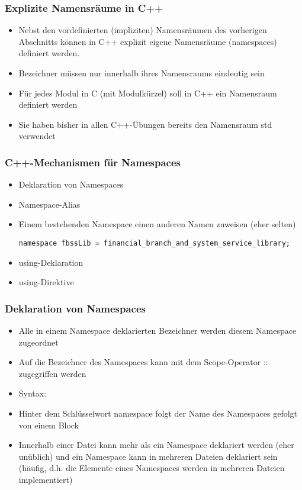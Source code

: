 \subsubsection{Explizite Namensräume in C++\hfill}
\label{sec:unterunterabschnitt}
\begin{itemize}
	\item Nebst den vordefinierten (impliziten) Namensräumen des vorherigen Abschnitts können in C++ explizit eigene Namensräume (namespaces) definiert werden.
	\item Bezeichner müssen nur innerhalb ihres Namensraums eindeutig sein
	\item Für jedes Modul in C (mit Modulkürzel) soll in C++ ein Namensraum definiert werden
	\item Sie haben bisher in allen C++-Übungen bereits den Namensraum std verwendet
\end{itemize}

\subsubsection{C++-Mechanismen für Namespaces\hfill}
\label{sec:unterunterabschnitt}
\begin{itemize}
	\item Deklaration von Namespaces
	\item Namespace-Alias
	\item[\-] Einem bestehenden Namespace einen anderen Namen zuweisen (eher selten)
\noindent
\begin{minipage}{\linewidth}
\begin{lstlisting}
namespace fbssLib = financial_branch_and_system_service_library;
\end{lstlisting}
\end{minipage}
	\item using-Deklaration
	\item using-Direktive
\end{itemize}

\subsubsection{Deklaration von Namespaces\hfill}
\label{sec:unterunterabschnitt}
\begin{itemize}
	\item Alle in einem Namespace deklarierten Bezeichner werden diesem Namespace zugeordnet
	\item Auf die Bezeichner des Namespaces kann mit dem Scope-Operator :: zugegriffen werden
	\item Syntax:
	\item[\-] Hinter dem Schlüsselwort namespace folgt der Name des Namespaces gefolgt von einem Block
	\item Innerhalb einer Datei kann mehr als ein Namespace deklariert werden (eher unüblich) und ein Namespace kann in mehreren Dateien deklariert sein (häufig, d.h. die Elemente eines Namespaces werden in mehreren Dateien implementiert)
\end{itemize}

